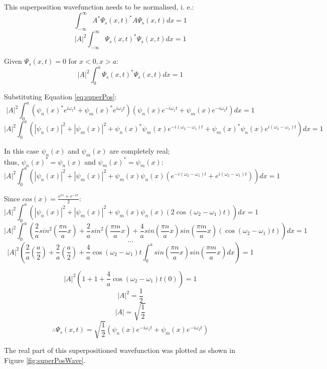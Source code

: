 This superposition wavefunction needs to be normalised, i. e.:
$$\int_{ -\infty}^{\infty} A^{*} \Psi_s (x,t)^{*} A\Psi_s (x,t)dx = 1$$
$$\left | A \right |^2 \int_{ -\infty}^{\infty} \Psi_s (x,t)^{*} \Psi_s (x,t)dx = 1$$

Given $\Psi_s (x,t)=0$ for $x<0, x>a$:
$$\left | A \right |^2 \int_{0}^{a} \Psi_s (x,t)^{*} \Psi_s (x,t)dx = 1$$

Substituting Equation \ref{eq:superPos}:
$$\left | A \right |^2 \int_{0}^{a} (\psi_n (x)^{*}e^{i \omega_{1} t} + \psi_m (x)^{*}e^{i \omega_{2} t}) (\psi_n (x)e^{-i \omega_{1} t} + \psi_m (x)e^{-i \omega_{2} t})dx = 1$$
$$\left | A \right |^2 \int_{0}^{a} (\left | \psi_n (x) \right |^2 + \left | \psi_m (x) \right |^2 + \psi_n (x)^{*}\psi_m (x)e^{-i(\omega_{2}- \omega_{1}) t} + \psi_m (x)^{*}\psi_n (x)e^{i(\omega_{2}- \omega_{1}) t})dx = 1$$

In this case $\psi_n (x)$ and $\psi_m (x)$ are completely real;\\
thus, $\psi_n (x)^{*} = \psi_n (x)$ and $\psi_m (x)^{*} = \psi_m (x)$:
$$ \left | A \right |^2 \int_{0}^{a}\left( \left | \psi_n (x) \right |^2 + \left | \psi_m (x) \right |^2 + \psi_m (x)\psi_n (x)(e^{-i(\omega_{2}- \omega_{1})t}+e^{i(\omega_{2}- \omega_{1})t})\right)dx = 1$$

Since $cos(x) = \frac{e^{ix}+e^{-ix}}{2}$:
$$ \left | A \right |^2 \int_{0}^{a}\left( \left | \psi_n (x) \right |^2 + \left | \psi_m (x) \right |^2 + \psi_m (x)\psi_n (x)(2\cos(\omega_{2}- \omega_{1})t)\right)dx = 1$$
$$ \left | A \right |^2 \int_{0}^{a}\left(\frac{2}{a} sin^{2}(\frac{\pi n}{a}x)+\frac{2}{a} sin^{2}(\frac{\pi m}{a}x)+\frac{4}{a} sin(\frac{\pi n}{a}x)sin(\frac{\pi m}{a}x)(\cos(\omega_{2}- \omega_{1})t)\right)dx = 1$$
$$...$$
$$\left | A \right |^2 \left( \frac{2}{a}\left(\frac{a}{2}\right) + \frac{2}{a}\left(\frac{a}{2}\right) + \frac{4}{a}\cos(\omega_{2}- \omega_{1})t\int_{0}^{a} sin(\frac{\pi n}{a}x)sin(\frac{\pi m}{a}x)dx \right)=1$$

$$\left | A \right |^2 \left( 1 + 1 + \frac{4}{a}\cos(\omega_{2}- \omega_{1})t(0) \right)=1$$
$$\left | A \right |^2 = \frac{1}{2}$$
$$\left | A \right | = \sqrt{\frac{1}{2}}$$
$$\therefore \Psi_s (x, t) = \sqrt{\frac{1}{2}} \left( \psi_n (x)e^{-i \omega_{1} t} + \psi_m (x)e^{-i \omega_{2} t}\right)$$

The real part of this superpositioned wavefunction was plotted as shown in Figure \ref{fig:superPosWave}.

